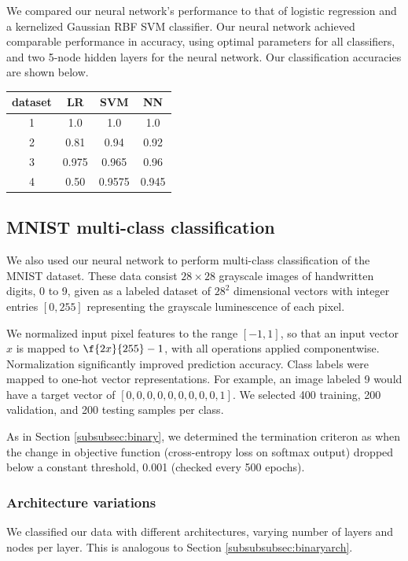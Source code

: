 \documentclass{article}
\begin{document}
\begin{multicols}{2}
We compared our neural network's performance to that of 
logistic regression and a kernelized Gaussian RBF SVM classifier.
Our neural network achieved comparable performance in accuracy,
using optimal parameters for all classifiers,
and two 5-node hidden layers for the neural network.
Our classification accuracies are shown below.

\begin{center}
\begin{tabular}{c|c|c|c}
dataset 	& LR  	& SVM & NN  \\\hline
        1	&1.0		& 1.0 & 1.0\\
        2	&0.81	& 0.94 & 0.92 \\
        3	&0.975 	& 0.965 & 0.96 \\
        4	&0.50	& 0.9575 & 0.945
\end{tabular}
\end{center}

\subsection{MNIST multi-class classification}

We also used our neural network to perform multi-class classification of the
MNIST dataset. These data consist $28\times 28$ grayscale images of handwritten
digits, 0 to 9, given as a labeled dataset of $28^2$ dimensional vectors
with integer entries $[0,255]$ representing the grayscale luminescence of each pixel.

We normalized input pixel features to the range $[-1, 1]$,
so that an input vector $x$ is mapped to $\f{2x}{255}-1$,
with all operations applied componentwise.
Normalization significantly improved prediction accuracy.
Class labels were mapped to one-hot vector representations.
For example, an image labeled 9 would have a 
target vector of $[0,0,0,0,0,0,0,0,0,1]$.
We selected 400 training, 200 validation, and 200 testing samples per class.

As in Section \ref{subsubsec:binary}, we determined the termination criteron as
when the change in objective function (cross-entropy loss on softmax output)
dropped below a constant threshold, 0.001 (checked every 500 epochs).

\subsubsection{Architecture variations}

We classified our data with different architectures, varying number of layers
and nodes per layer. This is analogous to Section \ref{subsubsubsec:binaryarch}.


\end{multicols}
\end{document}

